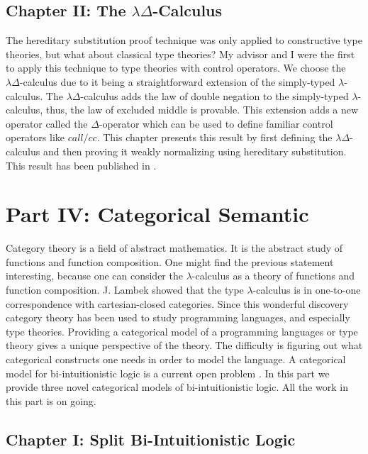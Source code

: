\subsection{Chapter II: The $\lambda\Delta$-Calculus}
\label{subsec:the_lambdadelta-calculus}
The hereditary substitution proof technique was only applied to
constructive type theories, but what about classical type theories? My
advisor and I were the first to apply this technique to type theories
with control operators.  We choose the $\lambda\Delta$-calculus due to
it being a straightforward extension of the simply-typed
$\lambda$-calculus.  The $\lambda\Delta$-calculus adds the law of
double negation to the simply-typed $\lambda$-calculus, thus, the law
of excluded middle is provable.  This extension adds a new operator
called the $\Delta$-operator which can be used to define familiar
control operators like $call/cc$.  This chapter presents this result
by first defining the $\lambda\Delta$-calculus and then proving it
weakly normalizing using hereditary substitution.  This result has
been published in \cite{Eades:2013}.


\section{Part IV: Categorical Semantic }
\label{sec:categorical_semantics}

Category theory is a field of abstract mathematics.  It is the
abstract study of functions and function composition.  One might find
the previous statement interesting, because one can consider the
$\lambda$-calculus as a theory of functions and function composition.
J. Lambek showed that the type $\lambda$-calculus is in one-to-one
correspondence with cartesian-closed categories.  Since this wonderful
discovery category theory has been used to study programming
languages, and especially type theories.  Providing a categorical
model of a programming languages or type theory gives a unique
perspective of the theory.  The difficulty is figuring out what
categorical constructs one needs in order to model the language.  A
categorical model for bi-intuitionistic logic is a current open
problem \cite{??}.  In this part we provide three novel categorical
models of bi-intuitionistic logic.  All the work in this part is on
going.


\subsection{Chapter I: Split Bi-Intuitionistic Logic}
\label{subsec:split_bi-intuitionistic_logic}

